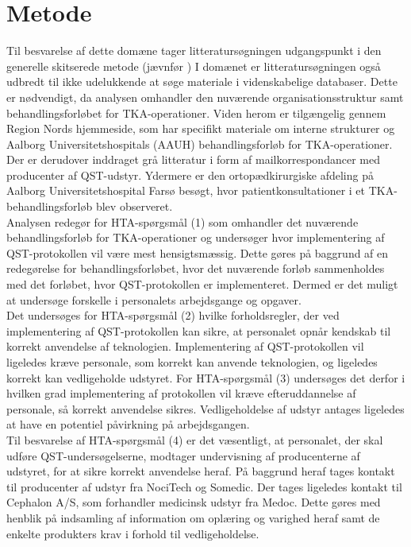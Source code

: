 \section{Metode}
Til besvarelse af dette domæne tager litteratursøgningen udgangspunkt i den generelle skitserede metode (jævnfør ) I domænet er litteratursøgningen også udbredt til ikke udelukkende at søge materiale i videnskabelige databaser. Dette er nødvendigt, da analysen omhandler den nuværende organisationsstruktur samt behandlingsforløbet for TKA-operationer. Viden herom er tilgængelig gennem Region Nords hjemmeside, som har specifikt materiale om interne strukturer og Aalborg Universitetshospitals (AAUH) behandlingsforløb for TKA-operationer. Der er derudover inddraget grå litteratur i form af mailkorrespondancer med producenter af QST-udstyr. Ydermere er den ortopædkirurgiske afdeling på Aalborg Universitetshospital Farsø besøgt, hvor patientkonsultationer i et TKA-behandlingsforløb blev observeret. \\
Analysen redegør for HTA-spørgsmål (1) som omhandler det nuværende behandlingsforløb for TKA-operationer og undersøger hvor implementering af QST-protokollen vil være mest hensigtsmæssig. Dette gøres på baggrund af en redegørelse for behandlingsforløbet, hvor det nuværende forløb sammenholdes med det forløbet, hvor QST-protokollen er implementeret. Dermed er det muligt at undersøge forskelle i personalets arbejdsgange og opgaver. \\
Det undersøges for HTA-spørgsmål (2) hvilke forholdsregler, der ved implementering af QST-protokollen kan sikre, at personalet opnår kendskab til korrekt anvendelse af teknologien.
Implementering af QST-protokollen vil ligeledes kræve personale, som korrekt kan anvende teknologien, og ligeledes korrekt kan vedligeholde udstyret. For HTA-spørgsmål (3) undersøges det derfor i hvilken grad implementering af protokollen vil kræve efteruddannelse af personale, så korrekt anvendelse sikres. Vedligeholdelse af udstyr antages ligeledes at have en potentiel påvirkning på arbejdsgangen. \\
Til besvarelse af HTA-spørgsmål (4) er det væsentligt, at personalet, der skal udføre QST-undersøgelserne, modtager undervisning af producenterne af udstyret, for at sikre korrekt anvendelse heraf. På baggrund heraf tages kontakt til producenter af udstyr fra NociTech og Somedic. Der tages ligeledes kontakt til Cephalon A/S, som forhandler medicinsk udstyr fra Medoc. Dette gøres med henblik på indsamling af information om oplæring og varighed heraf samt de enkelte produkters krav i forhold til vedligeholdelse.

